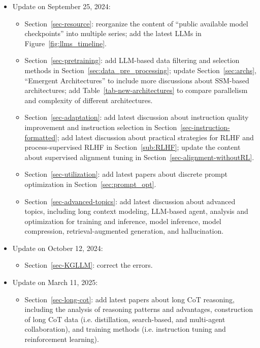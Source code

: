 {\begin{itemize}
\item {Update on September 25, 2024: }
\begin{itemize}
    \item {Section~\ref{sec-resource}: reorganize the content of ``public available model checkpoints'' into multiple series; add the latest LLMs in Figure~\ref{fig:llms_timeline}.}
    \item {Section~\ref{sec-pretraining}: add LLM-based data filtering and selection methods in Section~\ref{sec:data_pre_processing}; update Section~\ref{sec:archs}, ``Emergent Architectures'' to include more discussions about SSM-based architectures; add Table~\ref{tab-new-architectures} to compare parallelism and complexity of different architectures.}
    \item  {Section~\ref{sec-adaptation}: add latest discussion about instruction quality improvement and instruction selection in Section~\ref{sec-instruction-formatted}; add latest discussion about practical strategies for RLHF and process-supervised RLHF in Section~\ref{sub:RLHF}; update the content about supervised alignment tuning in Section~\ref{sec-alignment-withoutRL}.}
    \item {Section~\ref{sec-utilization}: add latest papers about discrete prompt optimization in Section~\ref{sec:prompt_opt}.}
    \item {Section~\ref{sec-advanced-topics}: add latest discussion about advanced topics, including long context modeling, LLM-based agent, analysis and optimization for training and inference, model inference, model compression, retrieval-augmented generation, and hallucination.}
\end{itemize}

\item {Update on October 12, 2024: }
\begin{itemize}
    \item Section~\ref{sec-KGLLM}: correct the errors.
\end{itemize}

\item {Update on March 11, 2025: }
\begin{itemize}
    \item Section~\ref{sec-long-cot}: add latest papers about long CoT reasoning, including the analysis of reasoning patterns and advantages, construction of long CoT data (i.e. distillation, search-based, and multi-agent collaboration), and training methods (i.e. instruction tuning and reinforcement learning).  
\end{itemize}


\end{itemize}}
